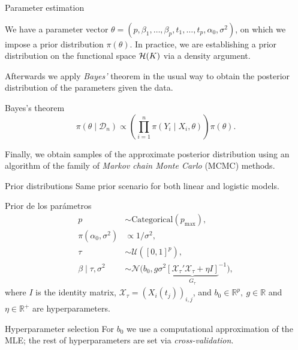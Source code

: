 \documentclass[10pt, english, professionalfonts]{beamer}
\newcommand{\R}{\mathbb{R}}
\newcommand{\Hcal}{\ensuremath\mathcal{H}}
\begin{document}
\begin{frame}{Parameter estimation}

  We have a parameter vector \(\theta = (p, \beta_1,\dots, \beta_p, t_1,\dots, t_p, \alpha_0, \sigma^2)\), on which we impose a prior distribution \(\pi(\theta)\). In practice, we are establishing a prior distribution on the functional space \(\Hcal(K)\) via a density argument.

  \vspace{1em}

  Afterwards we apply \textit{Bayes'}  theorem in the usual way to obtain the posterior distribution of the parameters given the data.

  \begin{block}{Bayes's theorem}
      \[
      \pi(\theta \mid \mathcal D_n) \propto \left( \prod_{i=1}^n \pi(Y_i\mid X_i, \theta) \right)\pi(\theta).
      \]
  \end{block}
  \vspace{1em}

  Finally, we obtain samples of the approximate posterior distribution using an algorithm of the family of \textit{Markov chain Monte Carlo} (MCMC) methods.

\end{frame}

\begin{frame}{Prior distributions}
  Same prior scenario for both linear and logistic models.
  \begin{block}{Prior de los parámetros}
    \vspace{-1em}
  \begin{align*}
    p &\sim \text{Categorical}(p_{\text{max}}),\\
  \pi(\alpha_0, \sigma^2)              & \propto 1/\sigma^2,                                                     \\
  \tau                     & \sim \mathcal U([0, 1]^p),                                              \\
  \beta\mid \tau, \sigma^2 & \sim \mathcal N\big(b_0, g\sigma^2{\underbrace{\left[\mathcal X_\tau' \mathcal X_\tau + \eta I\right]}_{G_\tau}}^{-1}\big),
\end{align*}
where \(I\) is the identity matrix, \(\mathcal X_\tau = (X_i(t_j))_{i,j}\), and \(b_0\in \R^p, \ g \in \R\) and \(\eta \in \R^+\) are hyperparameters.
\end{block}


\begin{alertblock}{Hyperparameter selection}
  \vspace{0.1em}
  For \(b_0\) we use a computational approximation of the MLE; the rest of hyperparameters are set via \textit{cross-validation}.
\end{alertblock}
\end{frame}
\end{document}
